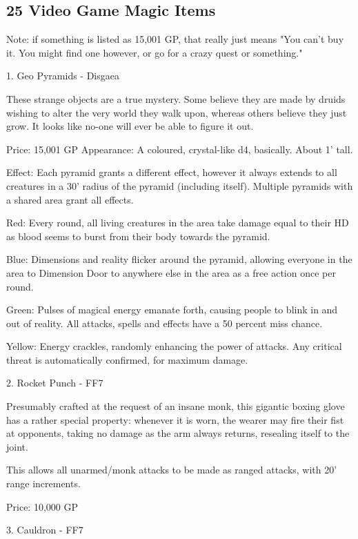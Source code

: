\subsection{25 Video Game Magic Items} \label{comm:25videogame}

Note: if something is listed as 15,001 GP, that really just means "You can't buy it. You might find one however, or go for a crazy quest or something." 

\begin{multicols}{2}

1. Geo Pyramids - Disgaea

These strange objects are a true mystery. Some believe they are made by druids wishing to alter the very world they walk upon, whereas others believe they just grow. It looks like no-one will ever be able to figure it out.

Price: 15,001 GP
Appearance: A coloured, crystal-like d4, basically. About 1' tall.

Effect: Each pyramid grants a different effect, however it always extends to all creatures in a 30' radius of the pyramid (including itself). Multiple pyramids with a shared area grant all effects.

Red: Every round, all living creatures in the area take damage equal to their HD as blood seems to burst from their body towards the pyramid.

Blue: Dimensions and reality flicker around the pyramid, allowing everyone in the area to Dimension Door to anywhere else in the area as a free action once per round.

Green: Pulses of magical energy emanate forth, causing people to blink in and out of reality. All attacks, spells and effects have a 50 percent miss chance.

Yellow: Energy crackles, randomly enhancing the power of attacks. Any critical threat is automatically confirmed, for maximum damage. 


2. Rocket Punch - FF7

Presumably crafted at the request of an insane monk, this gigantic boxing glove has a rather special property: whenever it is worn, the wearer may fire their fist at opponents, taking no damage as the arm always returns, resealing itself to the joint.

This allows all unarmed/monk attacks to be made as ranged attacks, with 20' range increments.

Price: 10,000 GP


3. Cauldron - FF7


\end{multicols}
